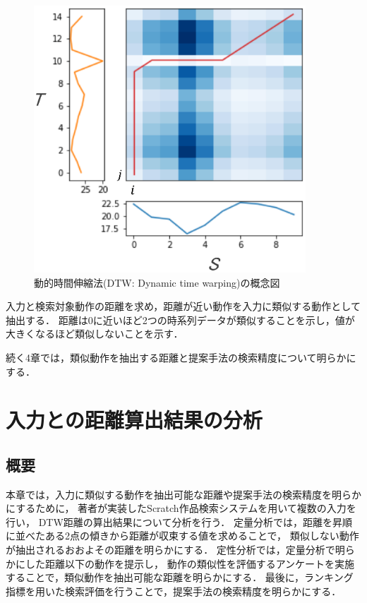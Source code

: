 \documentclass[11pt]{jreport}
\begin{document}
\begin{figure}[H]
    \centering
    \includegraphics[height=10cm]{dtw.eps}
    \caption{動的時間伸縮法(DTW: Dynamic time warping)の概念図}
    \label{dtw}
\end{figure}

入力と検索対象動作の距離を求め，距離が近い動作を入力に類似する動作として抽出する．
距離は0に近いほど2つの時系列データが類似することを示し，値が大きくなるほど類似しないことを示す．

続く4章では，類似動作を抽出する距離と提案手法の検索精度について明らかにする．


\chapter{入力との距離算出結果の分析}
\label{analysys}

\section{概要}
本章では，入力に類似する動作を抽出可能な距離や提案手法の検索精度を明らかにするために，
著者が実装したScratch作品検索システムを用いて複数の入力を行い，
DTW距離の算出結果について分析を行う．
定量分析では，距離を昇順に並べたある2点の傾きから距離が収束する値を求めることで，
類似しない動作が抽出されるおおよその距離を明らかにする．
定性分析では，定量分析で明らかにした距離以下の動作を提示し，
動作の類似性を評価するアンケートを実施することで，類似動作を抽出可能な距離を明らかにする．
最後に，ランキング指標を用いた検索評価を行うことで，提案手法の検索精度を明らかにする．
\end{document}
